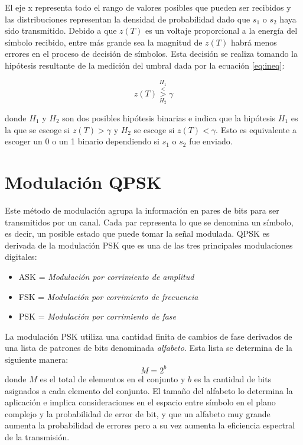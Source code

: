 El eje x representa todo el rango de valores posibles que pueden ser recibidos y las distribuciones
representan la densidad de probabilidad dado que $s_1$ o $s_2$ haya sido transmitido. Debido a que
$z(T)$ es un voltaje proporcional a la energ\'ia del s\'imbolo recibido, entre m\'as grande sea la
magnitud de $z(T)$ habr\'a menos errores en el proceso de decisi\'on de s\'imbolos. Esta decisi\'on
se realiza tomando la hip\'otesis resultante de la medici\'on del umbral dada por la ecuaci\'on
\ref{eq:ineq}\cite{sklar}:

\begin{equation}\label{eq:ineq}
z(T)\overset{H_1}{\underset{H_2}{\overset{<}{>}}}\gamma
\end{equation}

donde $H_1$ y $H_2$ son dos posibles hip\'otesis binarias e indica que la hip\'otesis $H_1$ es la que se
escoge si $z(T)>\gamma$ y $H_2$ se escoge si $z(T)< \gamma$. Esto es equivalente a escoger un 0 o un
1 binario dependiendo si $s_1$ o $s_2$ fue enviado.
\section{Modulaci\'on QPSK}

Este m\'etodo de modulaci\'on agrupa la informaci\'on en pares de
bits para ser transmitidos por un canal. Cada par representa lo que se denomina
un s\'imbolo, es decir, un posible estado que puede tomar la se\~nal modulada.
QPSK es derivada de la modulaci\'on PSK que es una de las tres principales
modulaciones digitales:
\begin{itemize}
  \item ASK = \emph{Modulaci\'on por corrimiento de amplitud}
  \item FSK = \emph{Modulaci\'on por corrimiento de frecuencia}
  \item PSK = \emph{Modulaci\'on por corrimiento de fase}
\end{itemize}

La modulaci\'on PSK utiliza una cantidad finita de cambios de fase derivados de
una lista de patrones de bits denominada \emph{alfabeto}. Esta lista se
determina de la siguiente manera:
\begin{equation}\label{eq:levels}
M=2^b
\end{equation}
donde $M$ es el total de elementos en el conjunto y $b$ es la cantidad de bits
asignados a cada elemento del conjunto. El tama\~no del alfabeto lo determina la
aplicaci\'on e implica consideraciones en el espacio entre s\'imbolo en el plano
complejo y la probabilidad de error de bit, y que un alfabeto muy grande aumenta
la probabilidad de errores pero a su vez aumenta la eficiencia espectral de la
transmisi\'on.

